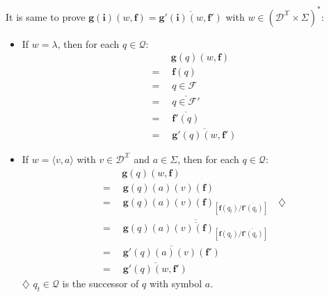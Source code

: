 \documentclass[a4paper, 11pt]{article}
\begin{document}
	It is same to prove $\bm{g}(\bm{i})(w, \bm{f}) = \overline{\bm{g}'(\bm{i})(w, \bm{f}')}$ with $w \in (\mathcal{D}^{\mathcal{X}} \times \Sigma)^*$:
	\begin{itemize}
		\item If $w = \lambda$, then for each $q \in \mathcal{Q}$:
		\begin{align*}
			&\qquad\ \bm{g}(q)(w, \bm{f})\\
			&= \quad \bm{f}(q)\\
			&= \quad q \in \mathcal{F}\\
			&= \quad \overline{q \in \mathcal{F}'}\\
			&= \quad \overline{\bm{f}'(q)}\\
			&= \quad \overline{\bm{g}'(q)(w, \bm{f}')}
		\end{align*}
		\item If $w = \langle v, a \rangle$ with $v \in \mathcal{D}^{\mathcal{X}}$ and $a \in \Sigma$, then for each $q \in \mathcal{Q}$:
		\begin{align*}
			&\qquad\ \bm{g}(q)(w, \bm{f})\\
			&= \quad \bm{g}(q)(a)(v)(\bm{f})\\
			&= \quad \bm{g}(q)(a)(v)(\bm{f})_{[\bm{f}(q_t) / \overline{\bm{f}'(q_t)}]} \quad \diamondsuit\\
			&= \quad \overline{\overline{\bm{g}(q)(a)(v)(\bm{f})_{[\bm{f}(q_t) / \overline{\bm{f}'(q_t)}]}}}\\
			&= \quad \overline{\bm{g}'(q)(a)(v)(\bm{f}')}\\
			&= \quad \overline{\bm{g}'(q)(w, \bm{f}')}
		\end{align*}
		$\diamondsuit$ $q_t \in \mathcal{Q}$ is the successor of $q$ with symbol $a$.\\
	\end{itemize}
	
\end{document}
